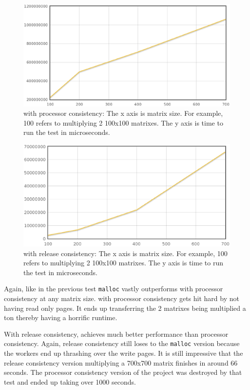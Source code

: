 \begin{figure}[!h]
\centering
\includegraphics[scale=0.40]{images/mmult-lh-fixed-thread.eps}
\caption{\projname{} with processor consistency: The x axis is matrix size. For example, 100 refers to multiplying 2 100x100 matrixes. The y axis is time to run the test in microseconds.}
\end{figure}

\begin{figure}[!h]
\centering
\includegraphics[scale=0.40]{images/mmlh-fixed-threads.eps}
\caption{\projname{} with release consistency: The x axis is matrix size. For example, 100 refers to multiplying 2 100x100 matrixes. The y axis is time to run the test in microseconds.}
\end{figure}

Again, like in the previous test \verb,malloc, vastly outperforms \projname{} with processor consistency at any matrix size. \projname{} with processor consistency gets hit hard by not having read only pages. It ends up transferring the 2 matrixes being multiplied a ton thereby having a horrific runtime.

With release consistency, \projname{} achieves much better performance than processor consistency. Again, release consistency still loses to the \verb,malloc, version because the workers end up thrashing over the write pages. It is still impressive that the release consistency version multiplying a 700x700 matrix finishes in around 66 seconds. The processor consistency version of the project was destroyed by that test and ended up taking over 1000 seconds.
